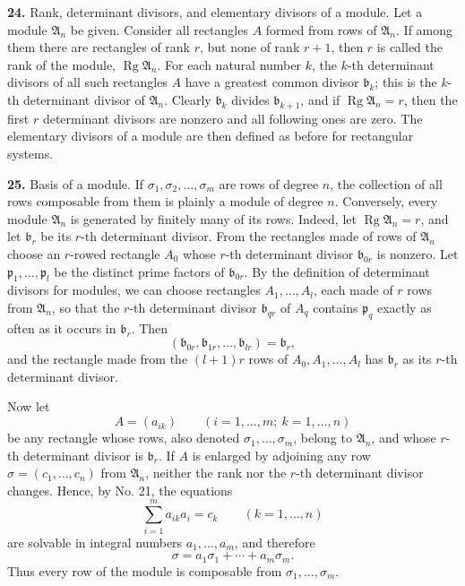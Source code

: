 \documentclass[11pt,a4paper]{article}
\begin{document}
\textbf{24.} Rank, determinant divisors, and elementary divisors of a module. Let a module \(\mathfrak A_n\) be given. Consider all rectangles \(A\) formed from rows of \(\mathfrak A_n\). If among them there are rectangles of rank \(r\), but none of rank \(r+1\), then \(r\) is called the rank of the module, \(\operatorname{Rg}\mathfrak A_n\). For each natural number \(k\), the \(k\)-th determinant divisors of all such rectangles \(A\) have a greatest common divisor \(\mathfrak b_k\); this is the \(k\)-th determinant divisor of \(\mathfrak A_n\). Clearly \(\mathfrak b_k\) divides \(\mathfrak b_{k+1}\), and if \(\operatorname{Rg}\mathfrak A_n=r\), then the first \(r\) determinant divisors are nonzero and all following ones are zero. The elementary divisors of a module are then defined as before for rectangular systems.

\textbf{25.} Basis of a module. If \(\sigma_1,\sigma_2,\ldots,\sigma_m\) are rows of degree \(n\), the collection of all rows composable from them is plainly a module of degree \(n\). Conversely, every module \(\mathfrak A_n\) is generated by finitely many of its rows. Indeed, let \(\operatorname{Rg}\mathfrak A_n=r\), and let \(\mathfrak b_r\) be its \(r\)-th determinant divisor. From the rectangles made of rows of \(\mathfrak A_n\) choose an \(r\)-rowed rectangle \(A_0\) whose \(r\)-th determinant divisor \(\mathfrak b_{0r}\) is nonzero. Let \(\mathfrak p_1,\ldots,\mathfrak p_l\) be the distinct prime factors of \(\mathfrak b_{0r}\). By the definition of determinant divisors for modules, we can choose rectangles \(A_1,\ldots,A_l\), each made of \(r\) rows from \(\mathfrak A_n\), so that the \(r\)-th determinant divisor \(\mathfrak b_{qr}\) of \(A_q\) contains \(\mathfrak p_q\) exactly as often as it occurs in \(\mathfrak b_r\). Then
\[
 (\mathfrak b_{0r},\mathfrak b_{1r},\ldots,\mathfrak b_{lr})=\mathfrak b_r,
\]
and the rectangle made from the \((l+1)r\) rows of \(A_0,A_1,\ldots,A_l\) has \(\mathfrak b_r\) as its \(r\)-th determinant divisor.

Now let
\[
 A=(a_{ik})\qquad(i=1,\ldots,m;\ k=1,\ldots,n)
\]
be any rectangle whose rows, also denoted \(\sigma_1,\ldots,\sigma_m\), belong to \(\mathfrak A_n\), and whose \(r\)-th determinant divisor is \(\mathfrak b_r\). If \(A\) is enlarged by adjoining any row \(\sigma=(c_1,\ldots,c_n)\) from \(\mathfrak A_n\), neither the rank nor the \(r\)-th determinant divisor changes. Hence, by No. 21, the equations
\[
 \sum_{i=1}^{m}a_{ik}a_i=c_k\qquad(k=1,\ldots,n)
\]
are solvable in integral numbers \(a_1,\ldots,a_m\), and therefore
\[
 \sigma=a_1\sigma_1+\cdots+a_m\sigma_m.
\]
Thus every row of the module is composable from \(\sigma_1,\ldots,\sigma_m\).
\end{document}
